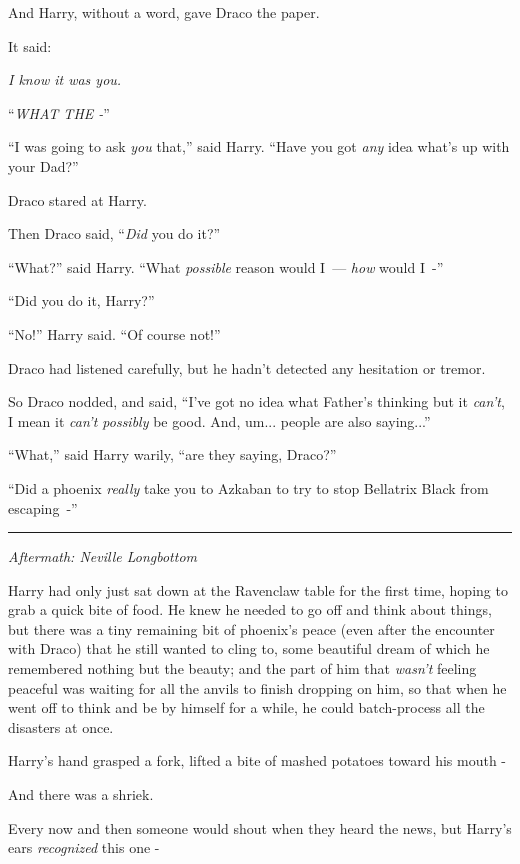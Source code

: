 And Harry, without a word, gave Draco the paper.

It said:

\emph{I know it was you.}

``\emph{WHAT THE -}''

``I was going to ask \emph{you} that,'' said Harry. ``Have you got \emph{any} idea what's up with your Dad?''

Draco stared at Harry.

Then Draco said, ``\emph{Did} you do it?''

``What?'' said Harry. ``What \emph{possible} reason would I~--- \emph{how} would I~-''

``Did you do it, Harry?''

``No!'' Harry said. ``Of course not!''

Draco had listened carefully, but he hadn't detected any hesitation or tremor.

So Draco nodded, and said, ``I've got no idea what Father's thinking but it \emph{can't}, I mean it \emph{can't possibly} be good. And, um... people are also saying...''

``What,'' said Harry warily, ``are they saying, Draco?''

``Did a phoenix \emph{really} take you to Azkaban to try to stop Bellatrix Black from escaping~-''

\begin{center}\rule{3in}{0.4pt}\end{center}

\emph{Aftermath: Neville Longbottom}

Harry had only just sat down at the Ravenclaw table for the first time, hoping to grab a quick bite of food. He knew he needed to go off and think about things, but there was a tiny remaining bit of phoenix's peace (even after the encounter with Draco) that he still wanted to cling to, some beautiful dream of which he remembered nothing but the beauty; and the part of him that \emph{wasn't} feeling peaceful was waiting for all the anvils to finish dropping on him, so that when he went off to think and be by himself for a while, he could batch-process all the disasters at once.

Harry's hand grasped a fork, lifted a bite of mashed potatoes toward his mouth -

And there was a shriek.

Every now and then someone would shout when they heard the news, but Harry's ears \emph{recognized} this one -

